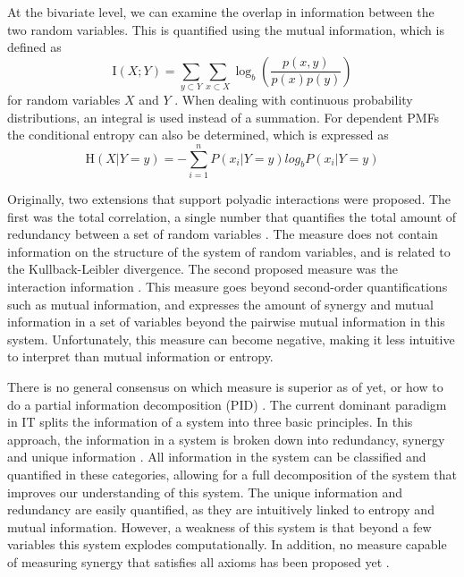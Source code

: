 \documentclass[../main.tex]{subfiles}
\begin{document}
At the bivariate level, we can examine the overlap in information between the two random variables.
This is quantified using the mutual information, which is defined as 
%
\begin{equation}
\label{MI}
\mathrm{I}(X;Y) = \sum_{y \subset Y} \sum_{x \subset X} \log_b (\frac{p(x,y)}{p(x) p(y)})
\end{equation}
%
for random variables $X$ and $Y$ \cite{cover2012elements}.
When dealing with continuous probability distributions, an integral is used instead of a summation.
For dependent PMFs the conditional entropy can also be determined, which is expressed as 
%
\begin{equation}
\mathrm{H}(X | Y = y) = -\sum^n_{i=1} P(x_i | Y = y) log_b P(x_i | Y = y)
\end{equation}
%


Originally, two extensions that support polyadic interactions were proposed.
The first was the total correlation, a single number that quantifies the total amount of redundancy between a set of random variables \cite{watanabe1960information}. 
The measure does not contain information on the structure of the system of random variables, and is related to the Kullback-Leibler divergence.
The second proposed measure was the interaction information \cite{mcgill1954multivariate}. 
This measure goes beyond second-order quantifications such as mutual information, and expresses the amount of synergy and mutual information in a set of variables beyond the pairwise mutual information in this system. 
Unfortunately, this measure can become negative, making it less intuitive to interpret than mutual information or entropy.

There is no general consensus on which measure is superior as of yet, or how to do a partial information decomposition (PID) \cite{griffith2011quantifying, williams2010nonnegative}.
The current dominant paradigm in IT splits the information of a system into three basic principles.
In this approach, the information in a system is broken down into redundancy, synergy and unique information \cite{williams2010nonnegative}.
All information in the system can be classified and quantified in these categories, allowing for a full decomposition of the system that improves our understanding of this system.
The unique information and redundancy are easily quantified, as they are intuitively linked to entropy and mutual information.
However, a weakness of this system is that beyond a few variables this system explodes computationally.
In addition, no measure capable of measuring synergy that satisfies all axioms has been proposed yet \cite{griffith2011quantifying}.
\end{document}
